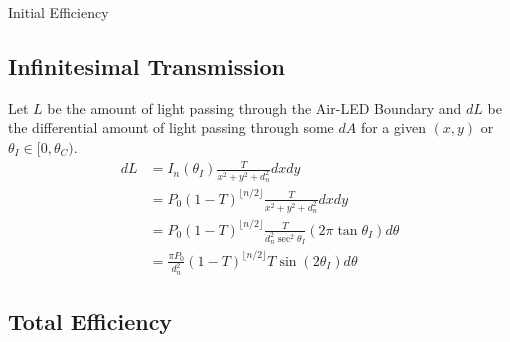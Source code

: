 \documentclass[12pt]{article}
\newcommand{\enterProblemHeader}[1]{
	\rhead{#1}
}
\newenvironment{main_section}[1]{
	\section{#1}
	\enterProblemHeader{#1}
}{
	\pagebreak
}
\begin{document}
\begin{main_section}{Initial Efficiency}
	\subsection{Infinitesimal Transmission}

	Let $L$ be the amount of light passing through the Air-LED Boundary and $dL$
	be the differential amount of light passing through some $dA$ for a given
	$(x, y)$ or $\theta_I \in [0, \theta_C)$.
	\begin{align*}
		dL &= I_n(\theta_I) \frac T {x^2 + y^2 + d_n^2} dx dy\\
		&= P_0 (1 - T)^{\lfloor n / 2 \rfloor} \frac T {x^2 + y^2 + d_n^2} dx
		dy\\
		&= P_0 (1 - T)^{\lfloor n / 2 \rfloor} \frac T {d_n^2 \sec^2 \theta_I}
		(2 \pi \tan \theta_I) d \theta\\
		&= \frac {\pi P_0} {d_n^2} (1 - T)^{\lfloor n / 2 \rfloor} T \sin (2
		\theta_I) d \theta
	\end{align*}

	\subsection{Total Efficiency}


\end{main_section}
\end{document}
